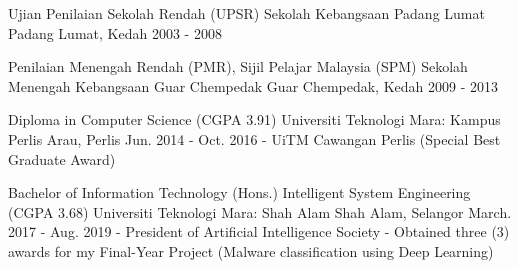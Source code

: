 

\begin{cventries}


\cventry
  {Ujian Penilaian Sekolah Rendah (UPSR)}
  {Sekolah Kebangsaan Padang Lumat}
  {Padang Lumat, Kedah}
  {2003 - 2008}
  {}

\cventry
  {Penilaian Menengah Rendah (PMR), Sijil Pelajar Malaysia (SPM)}
  {Sekolah Menengah Kebangsaan Guar Chempedak}
  {Guar Chempedak, Kedah}
  {2009 - 2013}
  {}

\cventry
  {Diploma in Computer Science (CGPA 3.91)}
  {Universiti Teknologi Mara: Kampus Perlis}
  {Arau, Perlis}
  {Jun. 2014 - Oct. 2016}
  {- UiTM Cawangan Perlis (Special Best Graduate Award)}

\hfill \break

\cventry
  {Bachelor of Information Technology (Hons.) Intelligent System Engineering (CGPA 3.68)}
  {Universiti Teknologi Mara: Shah Alam}
  {Shah Alam, Selangor}
  {March. 2017 - Aug. 2019}
  {
    - President of Artificial Intelligence Society
    \newline
    - Obtained three (3) awards for my Final-Year Project (Malware classification using Deep Learning)
  }

\end{cventries}
